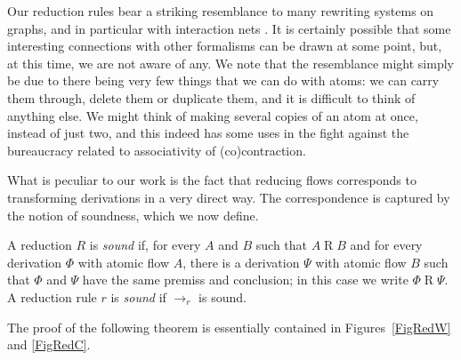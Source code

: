 \documentclass[a4paper]{LMCS}
\begin{document}
Our reduction rules bear a striking resemblance to many rewriting systems on graphs, and in particular with interaction nets \cite{Lafo:97:Interact:jb}. It is certainly possible that some interesting connections with other formalisms can be drawn at some point, but, at this time, we are not aware of any. We note that the resemblance might simply be due to there being very few things that we can do with atoms: we can carry them through, delete them or duplicate them, and it is difficult to think of anything else. We might think of making several copies of an atom at once, instead of just two, and this indeed has some uses in the fight against the bureaucracy related to associativity of (co)contraction.

What is peculiar to our work is the fact that reducing flows corresponds to transforming derivations in a very direct way. The correspondence is captured by the notion of soundness, which we now define.

\begin{defi}
A reduction $R$ is \emph{sound} if, for every $A$ and $B$ such that $A\mathrel{R}B$ and for every derivation $\Phi$ with atomic flow $A$, there is a derivation $\Psi$ with atomic flow $B$ such that $\Phi$ and $\Psi$ have the same premiss and conclusion; in this case we write $\Phi\mathrel{R}\Psi$. A reduction rule $r$ is \emph{sound} if $\to_r$ is sound.
\end{defi}

The proof of the following theorem is essentially contained in Figures~\ref{FigRedW} and \ref{FigRedC}.
\end{document}
